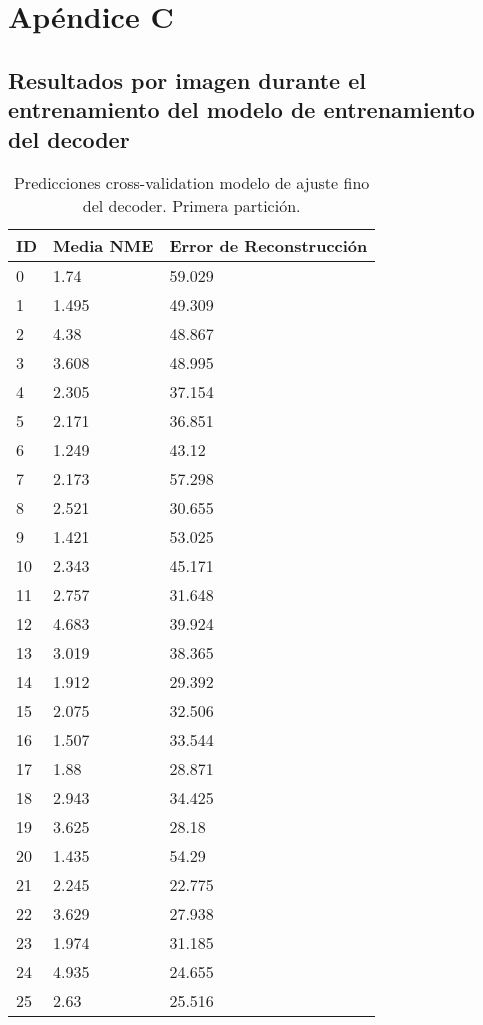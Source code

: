 
\chapter{Apéndice C}\label{ap:apendiceC}

\section{Resultados por imagen durante el entrenamiento del modelo de entrenamiento del decoder}

\begin{table}[!ht]
    \centering
    \caption{Predicciones cross-validation modelo de ajuste fino del decoder. Primera partición.}
    \begin{tabular}{|l|l|l|}
    \hline
    \cellcolor{gray!25}\textbf{ID} & \cellcolor{gray!25}\textbf{Media NME} & \cellcolor{gray!25}\textbf{Error de Reconstrucción} \\ \hline
        0 & 1.74 & 59.029 \\ \hline
        1 & 1.495 & 49.309 \\ \hline
        2 & 4.38 & 48.867 \\ \hline
        3 & 3.608 & 48.995 \\ \hline
        4 & 2.305 & 37.154 \\ \hline
        5 & 2.171 & 36.851 \\ \hline
        6 & 1.249 & 43.12 \\ \hline
        7 & 2.173 & 57.298 \\ \hline
        8 & 2.521 & 30.655 \\ \hline
        9 & 1.421 & 53.025 \\ \hline
        10 & 2.343 & 45.171 \\ \hline
        11 & 2.757 & 31.648 \\ \hline
        12 & 4.683 & 39.924 \\ \hline
        13 & 3.019 & 38.365 \\ \hline
        14 & 1.912 & 29.392 \\ \hline
        15 & 2.075 & 32.506 \\ \hline
        16 & 1.507 & 33.544 \\ \hline
        17 & 1.88 & 28.871 \\ \hline
        18 & 2.943 & 34.425 \\ \hline
        19 & 3.625 & 28.18 \\ \hline
        20 & 1.435 & 54.29 \\ \hline
        21 & 2.245 & 22.775 \\ \hline
        22 & 3.629 & 27.938 \\ \hline
        23 & 1.974 & 31.185 \\ \hline
        24 & 4.935 & 24.655 \\ \hline
        25 & 2.63 & 25.516 \\ \hline
    \end{tabular}
\end{table}

